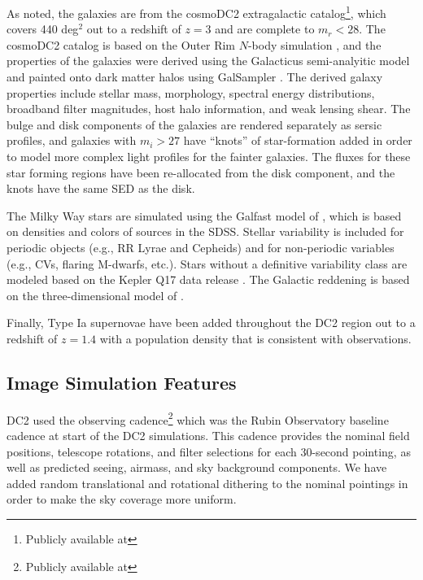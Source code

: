 \documentclass[11pt]{report}
\begin{document}
As noted, the galaxies are from the cosmoDC2 extragalactic catalog\footnote{Publicly available at }, which covers 440 deg$^2$ out to a redshift of $z = 3$ and are complete to $m_r <28$.  The cosmoDC2 catalog is based on the Outer Rim $N$-body simulation \citep{2019ApJS..245...16H}, and the properties of the galaxies were derived using the Galacticus semi-analyitic model \citep{benson_2010b} and painted onto dark matter halos using GalSampler \citep{2020MNRAS.495.5040H}.  The derived galaxy properties include stellar mass, morphology, spectral energy distributions, broadband filter magnitudes, host halo information, and weak lensing shear.   The bulge and disk components of the galaxies are rendered separately as sersic profiles, and galaxies with $m_i > 27$ have ``knots'' of star-formation added in order to model more complex light profiles for the fainter galaxies. The fluxes for these star forming regions have been re-allocated from the disk component, and the knots have the same SED as the disk.

The Milky Way stars are simulated using the Galfast model of \citet{2008ApJ...673..864J}, which is based on densities and colors of sources in the SDSS. Stellar variability is included for periodic objects (e.g., RR Lyrae and Cepheids) and for non-periodic variables (e.g., CVs, flaring M-dwarfs, etc.).  Stars without a definitive variability class are modeled based on the Kepler Q17 data release \citep{2016ksci.rept....3T}.  The Galactic reddening is based on the three-dimensional model of \cite{2005AJ....130..659A}.

Finally, Type Ia supernovae have been added throughout the DC2 region out to a redshift of $z=1.4$ with a population density that is consistent with observations.

\subsection{Image Simulation Features}

DC2 used the  observing cadence\footnote{Publicly available at } which was the Rubin Observatory baseline cadence at start of the DC2 simulations. This cadence provides the nominal field positions, telescope rotations, and filter selections for each 30-second pointing, as well as predicted seeing, airmass, and sky background components.  We have added random translational and rotational dithering to the nominal pointings in order to make the sky coverage more uniform.
\end{document}
